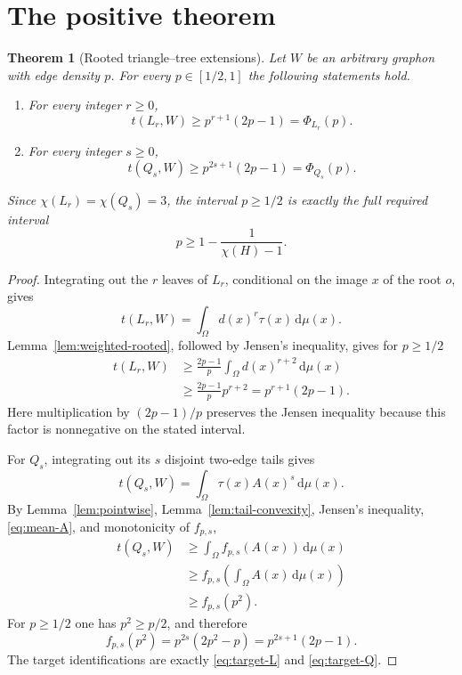 \documentclass[11pt]{article}
\newtheorem{theorem}{Theorem}[section]
\newcommand{\dd}{\,\mathrm{d}}
\begin{document}
\section{The positive theorem}

\begin{theorem}[Rooted triangle--tree extensions]
\label{thm:main}
Let $W$ be an arbitrary graphon with edge density $p$.  For every
$p\in[1/2,1]$ the following statements hold.

\begin{enumerate}
\item For every integer $r\geq0$,
\[
t(L_r,W)
\geq p^{r+1}(2p-1)
=\Phi_{L_r}(p).
\]

\item For every integer $s\geq0$,
\[
t(Q_s,W)
\geq p^{2s+1}(2p-1)
=\Phi_{Q_s}(p).
\]
\end{enumerate}

Since $\chi(L_r)=\chi(Q_s)=3$, the interval $p\geq1/2$ is exactly the
full required interval
\[
p\geq1-\frac1{\chi(H)-1}.
\]
\end{theorem}

\begin{proof}
Integrating out the $r$ leaves of $L_r$, conditional on the image $x$ of
the root $o$, gives
\[
t(L_r,W)=\int_\Omega d(x)^r\tau(x)\dd\mu(x).
\]
Lemma~\ref{lem:weighted-rooted}, followed by Jensen's inequality, gives
for $p\geq1/2$
\begin{align*}
t(L_r,W)
&\geq
\frac{2p-1}{p}\int_\Omega d(x)^{r+2}\dd\mu(x)
\\
&\geq
\frac{2p-1}{p}p^{r+2}
=p^{r+1}(2p-1).
\end{align*}
Here multiplication by $(2p-1)/p$ preserves the Jensen inequality
because this factor is nonnegative on the stated interval.

For $Q_s$, integrating out its $s$ disjoint two-edge tails gives
\[
t(Q_s,W)=\int_\Omega \tau(x)A(x)^s\dd\mu(x).
\]
By Lemma~\ref{lem:pointwise}, Lemma~\ref{lem:tail-convexity}, Jensen's
inequality, \eqref{eq:mean-A}, and monotonicity of $f_{p,s}$,
\begin{align*}
t(Q_s,W)
&\geq
\int_\Omega f_{p,s}(A(x))\dd\mu(x)
\\
&\geq
f_{p,s}\!\left(\int_\Omega A(x)\dd\mu(x)\right)
\\
&\geq f_{p,s}(p^2).
\end{align*}
For $p\geq1/2$ one has $p^2\geq p/2$, and therefore
\[
f_{p,s}(p^2)
=p^{2s}(2p^2-p)
=p^{2s+1}(2p-1).
\]
The target identifications are exactly \eqref{eq:target-L} and
\eqref{eq:target-Q}.
\end{proof}
\end{document}
